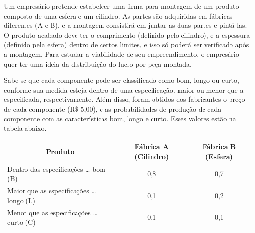 \documentclass[a4paper,11pt,fleqn]{article}\usepackage[]{graphicx}\usepackage[]{color}
\theoremstyle{definition}
\begin{document}
\begin{compactenum}[1.]
\item Um empresário pretende estabelecr uma firma para montagem de um
  produto composto de uma esfera e um cilindro. As partes são adquiridas
  em fábricas diferentes (A e B), e a montagem consistirá em juntar as
  duas partes e pintá-las. O produto acabado deve ter o comprimento
  (definido pelo cilindro), e a espessura (definido pela esfera) dentro
  de certos limites, e isso só poderá ser verificado após a
  montagem. Para estudar a viabilidade de seu empreendimento, o
  empresário quer ter uma ideia da distribuição do lucro por peça
  montada.

  Sabe-se que cada componente pode ser classificado como bom, longo ou
  curto, conforme sua medida esteja dentro de uma especificação, maior
  ou menor que a especificada, respectivamente. Além disso, foram
  obtidos dos fabricantes o preço de cada componente (R\$ 5,00), e as
  probabilidades de produção de cada componente com as características
  bom, longo e curto. Esses valores estão na tabela abaixo.

  \begin{table}[htbp]
    \begin{center}
      \begin{tabular}{l|c|c}
        \hline
        \multicolumn{1}{c|}{Produto} & Fábrica A (Cilindro) & Fábrica B (Esfera) \\ \hline
        Dentro das especificações … bom (B) & 0,8 & 0,7 \\
        Maior que as especificações … longo (L) & 0,1 & 0,2 \\
        Menor que as especificações … curto (C) & 0,1 & 0,1 \\ \hline
      \end{tabular}
    \end{center}
  \end{table}


\end{compactenum}
\end{document}
